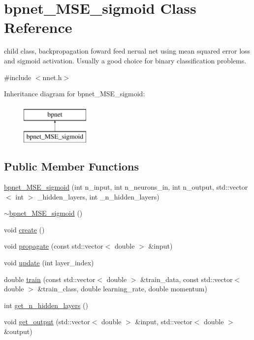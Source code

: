 \hypertarget{classbpnet__MSE__sigmoid}{\section{bpnet\-\_\-\-M\-S\-E\-\_\-sigmoid Class Reference}
\label{classbpnet__MSE__sigmoid}
}


child class, backpropagation foward feed nerual net using mean squared error loss and sigmoid activation. Usually a good choice for binary classification problems.  




{\ttfamily \#include $<$nnet.\-h$>$}

Inheritance diagram for bpnet\-\_\-\-M\-S\-E\-\_\-sigmoid\-:\begin{figure}[H]
\begin{center}
\leavevmode
\includegraphics[height=2.000000cm]{classbpnet__MSE__sigmoid}
\end{center}
\end{figure}
\subsection*{Public Member Functions}
\begin{DoxyCompactItemize}
\item 
\hyperlink{classbpnet__MSE__sigmoid_ae9db37565d0e635570178896965a9d8c}{bpnet\-\_\-\-M\-S\-E\-\_\-sigmoid} (int n\-\_\-input, int n\-\_\-neurons\-\_\-in, int n\-\_\-output, std\-::vector$<$ int $>$ \-\_\-hidden\-\_\-layers, int \-\_\-n\-\_\-hidden\-\_\-layers)
\item 
\hyperlink{classbpnet__MSE__sigmoid_ad01362c64b5a4ad692f5a7ce77ab9f3e}{$\sim$bpnet\-\_\-\-M\-S\-E\-\_\-sigmoid} ()
\item 
void \hyperlink{classbpnet__MSE__sigmoid_a1e80df296941ce0751c8106998db05ed}{create} ()
\item 
void \hyperlink{classbpnet__MSE__sigmoid_a1ddf105554e8b9471417f624d8142077}{propagate} (const std\-::vector$<$ double $>$ \&input)
\item 
void \hyperlink{classbpnet__MSE__sigmoid_a0f934ee98b63ff4d96584cea3736a6c2}{update} (int layer\-\_\-index)
\item 
double \hyperlink{classbpnet__MSE__sigmoid_a8d69e64434b2aa992744746e5b687984}{train} (const std\-::vector$<$ double $>$ \&train\-\_\-data, const std\-::vector$<$ double $>$ \&train\-\_\-class, double learning\-\_\-rate, double momentum)
\item 
int \hyperlink{classbpnet__MSE__sigmoid_a1aab79a52a004260011a68bf50eabd28}{get\-\_\-n\-\_\-hidden\-\_\-layers} ()
\item 
void \hyperlink{classbpnet__MSE__sigmoid_ab4bf4f79ba1625fd155e7de251b57609}{get\-\_\-output} (std\-::vector$<$ double $>$ \&input, std\-::vector$<$ double $>$ \&output)
\end{DoxyCompactItemize}
